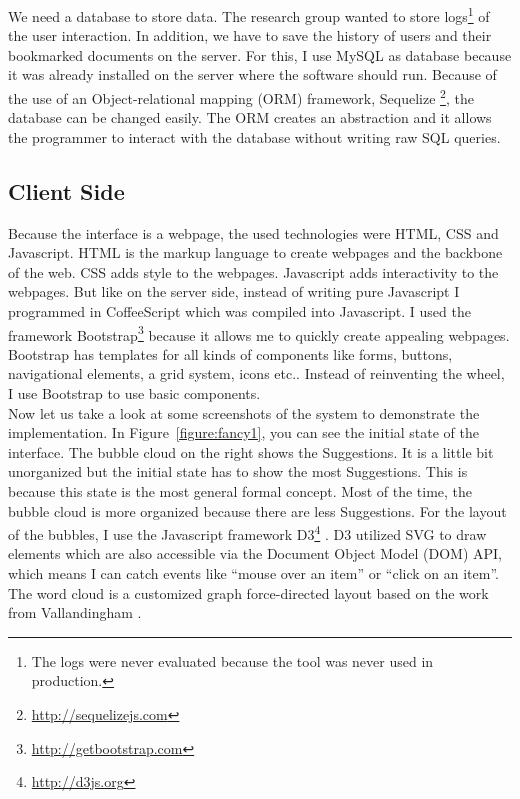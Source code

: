 \documentclass[11pt]{report}
\begin{document}
We need a database to store data. The research group wanted to store logs\footnote{The logs were never evaluated because the tool was never used in production.} of the user interaction. In addition, we have to save the history of users and their bookmarked documents on the server. For this, I use MySQL as database because it was already installed on the server where the software should run. Because of the use of an Object-relational mapping (ORM) framework, Sequelize \footnote{\url{http://sequelizejs.com}}, the database can be changed easily. The ORM creates an abstraction and it allows the programmer to interact with the database without writing raw SQL queries.

\subsection{Client Side}

Because the interface is a webpage, the used technologies were HTML, CSS and Javascript. HTML is the markup language to create webpages and the backbone of the web. CSS adds style to the webpages. Javascript adds interactivity to the webpages. But like on the server side, instead of writing pure Javascript I programmed in CoffeeScript which was compiled into Javascript. I used the framework Bootstrap\footnote{\url{http://getbootstrap.com}} because it allows me to quickly create appealing webpages. Bootstrap has templates for all kinds of components like forms, buttons, navigational elements, a grid system, icons etc.. Instead of reinventing the wheel, I use Bootstrap to use basic components.\\

Now let us take a look at some screenshots of the system to demonstrate the implementation. In Figure~\ref{figure:fancy1}, you can see the initial state of the interface. The bubble cloud on the right shows the Suggestions. It is a little bit unorganized but the initial state has to show the most Suggestions. This is because this state is the most general formal concept. Most of the time, the bubble cloud is more organized because there are less Suggestions. For the layout of the bubbles, I use the Javascript framework D3\footnote{\url{http://d3js.org}} \cite{Bostock2011}. D3 utilized SVG to draw elements which are also accessible via the Document Object Model (DOM) API, which means I can catch events like ``mouse over an item'' or ``click on an item''. The word cloud is a customized graph force-directed layout based on the work from Vallandingham \cite{Vallandingham}. \\
\end{document}
